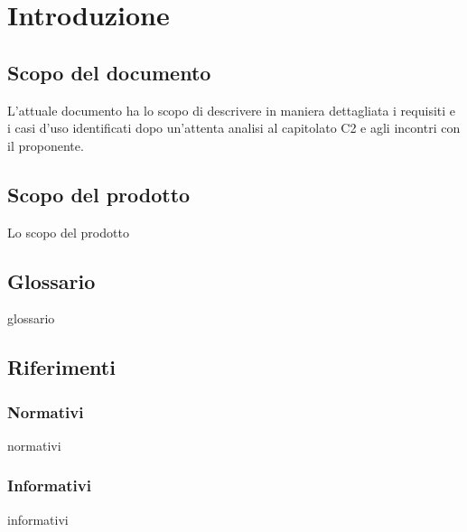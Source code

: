\section{Introduzione}
\subsection{Scopo del documento}
L'attuale documento ha lo scopo di descrivere in maniera dettagliata i requisiti e i casi d'uso identificati dopo un'attenta analisi al capitolato C2 e agli incontri con il proponente.
\subsection{Scopo del prodotto}
Lo scopo del prodotto
\subsection{Glossario}
glossario
\subsection{Riferimenti}
\subsubsection{Normativi}
normativi
\subsubsection{Informativi}
informativi